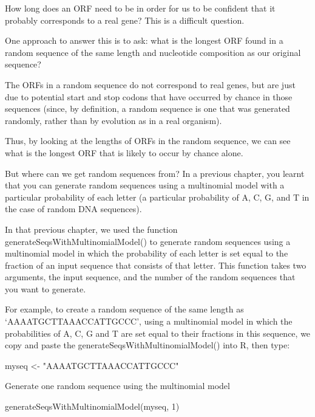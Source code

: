 \documentclass[
]{book}
\newenvironment{Shaded}{\begin{snugshade}}{\end{snugshade}}
\newcommand{\DecValTok}[1]{\textcolor[rgb]{0.00,0.00,0.81}{#1}}
\newcommand{\FunctionTok}[1]{\textcolor[rgb]{0.00,0.00,0.00}{#1}}
\newcommand{\NormalTok}[1]{#1}
\newcommand{\OtherTok}[1]{\textcolor[rgb]{0.56,0.35,0.01}{#1}}
\newcommand{\StringTok}[1]{\textcolor[rgb]{0.31,0.60,0.02}{#1}}
\begin{document}
How long does an ORF need to be in order for us to be confident that it probably corresponds to a real gene? This is a difficult question.

One approach to answer this is to ask: what is the longest ORF found in a random sequence of the same length and nucleotide composition as our original sequence?

The ORFs in a random sequence do not correspond to real genes, but are just due to potential start and stop codons that have occurred by chance in those sequences (since, by definition, a random sequence is one that was generated randomly, rather than by evolution as in a real organism).

Thus, by looking at the lengths of ORFs in the random sequence, we can see what is the longest ORF that is likely to occur by chance alone.

But where can we get random sequences from? In a previous chapter, you learnt that you can generate random sequences using a multinomial model with a particular probability of each letter (a particular probability of A, C, G, and T in the case of random DNA sequences).

In that previous chapter, we used the function generateSeqsWithMultinomialModel() to generate random sequences using a multinomial model in which the probability of each letter is set equal to the fraction of an input sequence that consists of that letter. This function takes two arguments, the input sequence, and the number of the random sequences that you want to generate.

For example, to create a random sequence of the same length as `AAAATGCTTAAACCATTGCCC', using a multinomial model in which the probabilities of A, C, G and T are set equal to their fractions in this sequence, we copy and paste the generateSeqsWithMultinomialModel() into R, then type:

\begin{Shaded}
\begin{Highlighting}[]
\NormalTok{myseq    }\OtherTok{\textless{}{-}} \StringTok{"AAAATGCTTAAACCATTGCCC"}
\end{Highlighting}
\end{Shaded}

Generate one random sequence using the multinomial model

\begin{Shaded}
\begin{Highlighting}[]
\FunctionTok{generateSeqsWithMultinomialModel}\NormalTok{(myseq, }\DecValTok{1}\NormalTok{) }
\end{Highlighting}
\end{Shaded}
\end{document}
